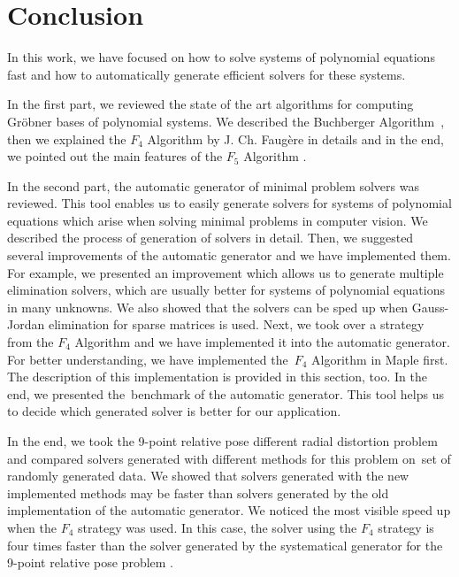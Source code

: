 \chapter{Conclusion}
In this work, we have focused on how to solve systems of polynomial equations fast and how to automatically generate efficient solvers for these systems.

In the first part, we reviewed the state of the art algorithms for computing Gr\"obner bases of polynomial systems. We described the Buchberger Algorithm~\cite{Buchberger65}, then we explained the $F_4$ Algorithm \cite{F4} by J. Ch. Faug\`ere in details and in the end, we pointed out the main features of the $F_5$ Algorithm \cite{F5}.

In the second part, the automatic generator \cite{AutoGen} of minimal problem solvers was reviewed. This tool enables us to easily generate solvers for systems of polynomial equations which arise when solving minimal problems in computer vision. We described the process of generation of solvers in detail. Then, we suggested several improvements of the automatic generator and we have implemented them. For example, we presented an improvement which allows us to generate multiple elimination solvers, which are usually better for systems of polynomial equations in many unknowns. We also showed that the solvers can be sped up when Gauss-Jordan elimination for sparse matrices is used. Next, we took over a strategy from the $F_4$ Algorithm \cite{F4} and we have implemented it into the automatic generator. For better understanding, we have implemented the~$F_4$ Algorithm \cite{F4} in Maple first. The description of this implementation is provided in this section, too. In the end, we presented the~benchmark of the automatic generator. This tool helps us to decide which generated solver is better for our application.

In the end, we took the 9-point relative pose different radial distortion problem~\cite{9pt} and compared solvers generated with different methods for this problem on~set of randomly generated data. We showed that solvers generated with the new implemented methods may be faster than solvers generated by the old implementation of the automatic generator. We noticed the most visible speed up when the $F_4$ strategy was used. In this case, the solver using the $F_4$ strategy is four times faster than the solver generated by the systematical generator for the 9-point relative pose problem \cite{9pt}.
